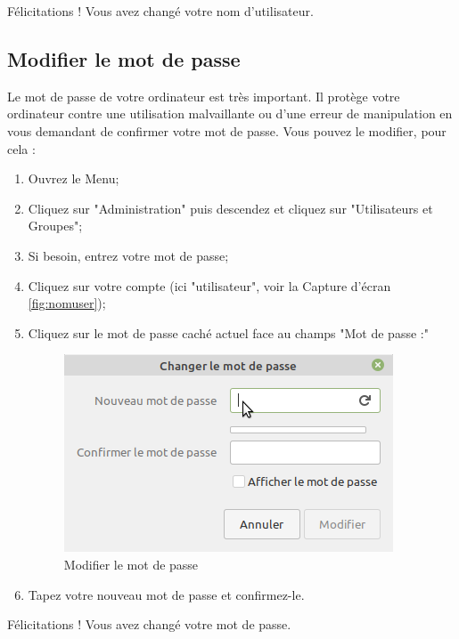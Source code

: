 \documentclass[12pt]{book}
\begin{document}
		Félicitations ! Vous avez changé votre nom d'utilisateur.
	\subsection{Modifier le mot de passe}
		Le mot de passe de votre ordinateur est très important. 
		Il protège votre ordinateur contre une utilisation malvaillante ou d'une erreur de manipulation en vous demandant de confirmer votre mot de passe.
		Vous pouvez le modifier, pour cela :
		\begin{enumerate}
			\item Ouvrez le Menu;
			\item Cliquez sur "Administration" puis descendez et cliquez sur "Utilisateurs et Groupes";
			\item Si besoin, entrez votre mot de passe;
			\item Cliquez sur votre compte (ici "utilisateur", voir la Capture d'écran \ref{fig:nomuser});
			\item Cliquez sur le mot de passe caché actuel face au champs "Mot de passe :"
			\begin{figure}[h]
				\centering
				\includegraphics[width=.5\textwidth]{include/mdpuser.png}
				\caption{Modifier le mot de passe}
				\label{fig:ndpuser}
			\end{figure}
			\item Tapez votre nouveau mot de passe et confirmez-le.
		\end{enumerate}
		Félicitations ! Vous avez changé votre mot de passe.
\end{document}
